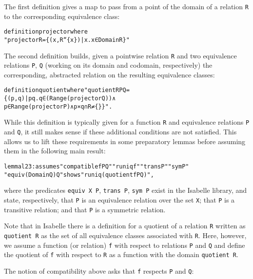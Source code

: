 \documentclass[
]{llncs}
\newenvironment{mytable}{
\vspace{0.2ex}
\begin{center}\begin{minipage}
{0.9\textwidth}\renewcommand{\baselinestretch}{0.75}\begin{small}}
{\end{small}\end{minipage}\end{center}
\vspace{0.1ex}
}
\newcommand{\I}{Isabelle}
\begin{document}
The first definition gives a map to pass from a point of the domain of a relation \verb|R| to the corresponding equivalence class:
\begin{mytable}
\begin{alltt}
definition projector where 
"projector R = \{(x,R``\{x\}) | x. x ∈ Domain R \}"
\end{alltt}\end{mytable}
The second definition builds, given a pointwise relation \verb|R| and two equivalence relations \verb|P|, \verb|Q| (working on its domain and codomain, respectively) the corresponding, abstracted relation on the resulting equivalence classes:
\begin{mytable}
\begin{alltt}
definition quotient where "quotient R P Q = 
\{(p,q)| p q. q ∈ (Range (projector Q)) ∧ 
p ∈ Range (projector P) ∧ p × q ∩ R ≠ \{\} \}".
\end{alltt}
\end{mytable}
While this definition is typically given for a function \verb|R| and equivalence relations \verb|P| and \verb|Q|, it still makes sense if these additional conditions are not satisfied.
This allows us to lift these requirements in some preparatory lemmas before assuming them in the following main result:
\label{RefWellDefinednessTheorem}
\begin{mytable}
\begin{alltt}
lemma l23: assumes "compatible f P Q" "runiq f" "trans P" "sym P"
"equiv (Domain Q) Q" shows "runiq (quotient f P Q)",
\end{alltt}
\end{mytable}
where the predicates \verb|equiv X P|, \verb|trans P|, \verb|sym P| exist in the \I{} library, and state, respectively, that \verb|P| is an equivalence relation over the set \verb|X|; that \verb|P| is a transitive relation; and that \verb|P| is a symmetric relation.

Note that in \I{} there is a definition for a quotient of a relation \verb|R| written as \verb|quotient R| as the set of all equivalence classes associated with \verb|R|. Here, however, we assume a  function (or relation) \verb|f| with respect to relations \verb|P| and \verb|Q| and define the quotient of \verb|f| with respect to \verb|R| as a function with the domain \verb|quotient R|.

The notion of compatibility above asks that \verb|f| respects \verb|P| and \verb|Q|:\smallskip
\end{document}
